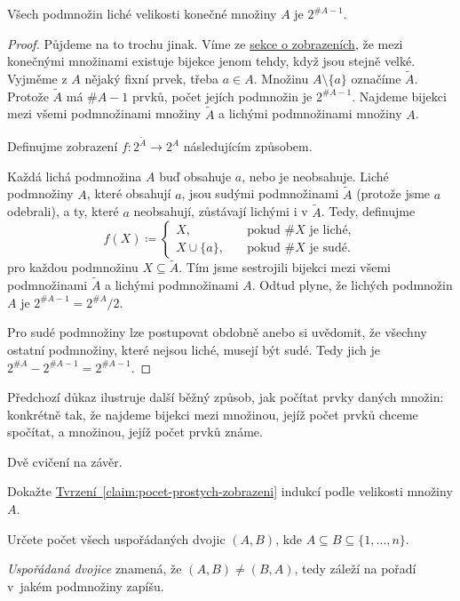 \begin{claim}
\label{claim:pocet-podmnozin-liche-velikosti}
 Všech podmnožin liché velikosti konečné množiny $A$ je $2^{\#A - 1}$.
\end{claim}
\begin{proof}
 Půjdeme na to trochu jinak. Víme ze \hyperref[ssec:zobrazeni]{sekce o
 zobrazeních}, že mezi konečnými množinami existuje bijekce jenom tehdy, když
 jsou stejně velké. Vyjměme z $A$ nějaký fixní prvek, třeba $a \in A$. Množinu
 ${A \setminus \{a\}}$ označíme $\tilde{A}$. Protože $\tilde{A}$ má $\# A - 1$
 prvků, počet jejích podmnožin je $2^{\# A - 1}$. Najdeme bijekci mezi všemi
 podmnožinami množiny $\tilde{A}$ a lichými podmnožinami množiny $A$.

 Definujme zobrazení $f:2^{\tilde{A}} \to 2^{A}$ následujícím způsobem.

 Každá lichá podmnožina $A$ buď obsahuje $a$, nebo je neobsahuje. Liché
 podmnožiny $A$, které obsahují $a$, jsou sudými podmnožinami $\tilde{A}$
 (protože jsme $a$ odebrali), a ty, které $a$ neobsahují, zůstávají lichými i v
 $\tilde{A}$. Tedy, definujme
 \[
  f(X) \coloneqq
  \begin{cases}
   X, &\quad \text{pokud $\# X$ je liché},\\
   X \cup \{a\}, &\quad \text{pokud $\# X$ je sudé}.
  \end{cases}
 \]
 pro každou podmnožinu $X \subseteq \tilde{A}$. Tím jsme sestrojili bijekci mezi
 všemi podmnožinami $\tilde{A}$ a lichými podmnožinami $A$. Odtud plyne, že
 lichých podmnožin $A$ je $2^{\# A - 1} = 2^{\# A} / 2$.

 Pro sudé podmnožiny lze postupovat obdobně anebo si uvědomit, že všechny
 ostatní podmnožiny, které nejsou liché, musejí být sudé. Tedy jich je $2^{\# A}
 - 2^{\# A - 1} = 2^{\# A - 1}$.
\end{proof}

Předchozí důkaz ilustruje další běžný způsob, jak počítat prvky daných množin:
konkrétně tak, že najdeme bijekci mezi množinou, jejíž počet prvků chceme
spočítat, a množinou, jejíž počet prvků známe.

Dvě cvičení na závěr.

\begin{exercise}
 Dokažte
 \hyperref[claim:pocet-prostych-zobrazeni]{Tvrzení~\ref*{claim:pocet-prostych-zobrazeni}}
 indukcí podle velikosti množiny $A$.
\end{exercise}

\begin{exercise}
 Určete počet všech uspořádaných dvojic $(A,B)$, kde $A \subseteq B \subseteq
 \{1,\ldots,n\}$.

 \emph{Uspořádaná dvojice} znamená, že $(A,B) \neq (B,A)$, tedy záleží na pořadí
 v~jakém podmnožiny zapíšu.
\end{exercise}
